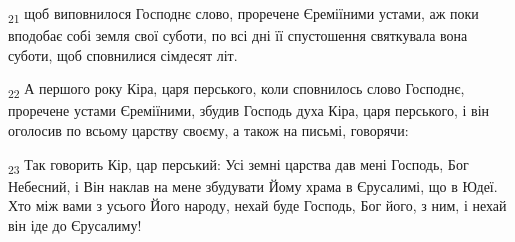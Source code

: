 \begin{tcolorbox}
\textsubscript{21} щоб виповнилося Господнє слово, проречене Єреміїними устами, аж поки вподобає собі земля свої суботи, по всі дні її спустошення святкувала вона суботи, щоб сповнилися сімдесят літ.
\end{tcolorbox}
\begin{tcolorbox}
\textsubscript{22} А першого року Кіра, царя перського, коли сповнилось слово Господнє, проречене устами Єреміїними, збудив Господь духа Кіра, царя перського, і він оголосив по всьому царству своєму, а також на письмі, говорячи:
\end{tcolorbox}
\begin{tcolorbox}
\textsubscript{23} Так говорить Кір, цар перський: Усі земні царства дав мені Господь, Бог Небесний, і Він наклав на мене збудувати Йому храма в Єрусалимі, що в Юдеї. Хто між вами з усього Його народу, нехай буде Господь, Бог його, з ним, і нехай він іде до Єрусалиму!
\end{tcolorbox}

